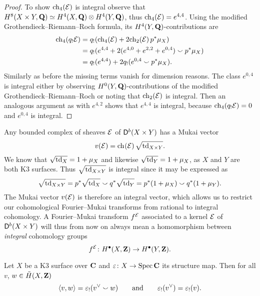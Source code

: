 \begin{proof}
    To show $\ch[4]{\E}$ is integral observe that $H^8(X \times Y, \mathbf Q) \simeq H^4(X, \mathbf Q) \otimes H^4(Y, \mathbf Q)$, thus $\ch[4]{\E} = e^{4,4}$. Using the modified Grothendieck--Riemann--Roch formula, its $H^4(Y, \mathbf Q)$-contributions are
    \begin{align*}
        \ch[4]{q_!\E} &= q_!(\ch[4]{\E} + 2\ch[2]{\E}p^*\mu_X) \\
        &= q_!(e^{4,4} + 2(e^{4,0} + e^{2,2} + e^{0,4})\smallsmile p^*\mu_X) \\
        &= q_!(e^{4,4}) + 2q_!(e^{0,4} \smallsmile p^*\mu_X).
    \end{align*}
    Similarly as before the missing terms vanish for dimension reasons. The class $e^{0,4}$ is integral either by observing $H^0(Y, \mathbf Q)$-contributions of the modified Grothendieck--Riemann--Roch or noting that $\ch[2]{\E}$ is integral. Then an analogous argument as with $e^{4,2}$ shows that $e^{4,4}$ is integral, because $\ch[4]{q_!\E} = 0$ and $e^{0,4}$ is integral. 
\end{proof}

\begin{remark}
    \label{Remark for rational to integral fm restriction}
    Any bounded complex of sheaves $\mathcal E$ of $\mathsf{D}^b(X \times Y)$ has a Mukai vector
    \[
        v(\E) = \ch[]{\E}\sqrt{\tdclass{X \times Y}}.
    \]
    We know that $\sqrt{\operatorname{td}_{X}} = 1 + \mu_X$ and likewise $\sqrt{\operatorname{td}_{Y}} = 1 + \mu_X$, as $X$ and $Y$ are both K3 surfaces. Thus $\sqrt{\operatorname{td}_{X \times Y}}$ is integral since it may be expressed as
    \[
        \sqrt{\operatorname{td}_{X \times Y}} = p^*\sqrt{\operatorname{td}_{X}} \smallsmile q^*\sqrt{\operatorname{td}_{Y}} = p^*(1 + \mu_X) \smallsmile q^*(1 + \mu_Y).
    \]
    The Mukai vector $v(\mathcal E)$ is therefore an integral vector, which allows us to restrict our cohomological Fourier--Mukai transforms from rational to integral cohomology. A Fourier--Mukai transform $f^{\mathcal E}$ associated to a kernel $\mathcal E$ of $\mathsf{D}^b(X \times Y)$ will thus from now on always mean a homomorphism between \emph{integral} cohomology groups
    \[
        f^{\mathcal E} \colon H^{\bullet}(X, \mathbf Z) \to H^{\bullet}(Y, \mathbf Z).
    \] 
\end{remark}

\begin{lemma}
    \label{Intersection pairing through push-forward of structure map}
    Let $X$ be a K3 surface over $\mathbf C$ and $\varepsilon \colon X \to \operatorname{Spec}\mathbf C$ its structure map. Then for all $v$, $w \in \,\tilde{\!{H}}(X, \mathbf Z)$
    \[
        \langle v, w \rangle = \varepsilon_!(v^\vee \smallsmile w) \qquad \text{and} \qquad \varepsilon_!(v^\vee) = \varepsilon_!(v). 
    \] 
\end{lemma}

